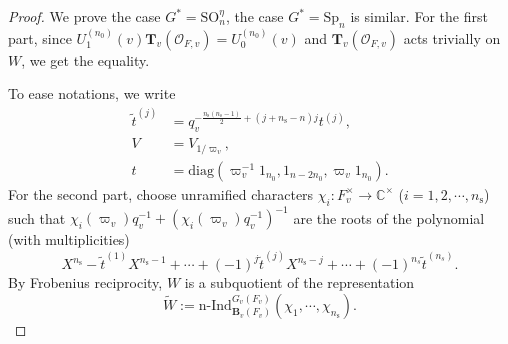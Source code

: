 \documentclass[12pt,oneside,reqno]{amsart}
\theoremstyle{plain}
\begin{document}
	\begin{proof}
		We prove the case $G^\ast=\mathrm{SO}_n^\eta$, the case $G^\ast=\mathrm{Sp}_n$ is similar.
		For the first part,
		since
		$U_1^{(n_0)}(v)
		\mathbf{T}_v(\mathcal{O}_{F,v})
		=
		U_0^{(n_0)}(v)$
		and
		$\mathbf{T}_v(\mathcal{O}_{F,v})$
		acts trivially on
		$W$,
		we get the equality.
		
		
		
		
		To ease notations,
		we write
		\begin{align*}
			\widetilde{t}^{(j)}
			&
			=
			q_v^{-\frac{n_\mathrm{s}(n_\mathrm{s}-1)}{2}+(j+n_\mathrm{s}-n)j}
			t^{(j)},
			\\
			V
			&
			=V_{1/\varpi_v},
			\\	  	
			t
			&
			=
			\mathrm{diag}
			(\varpi_v^{-1}1_{n_0},1_{n-2n_0},\varpi_v1_{n_0}).
		\end{align*}
		For the second part,
		choose unramified characters
		$\chi_i\colon
		F_v^\times
		\rightarrow
		\mathbb{C}^\times$
		($i=1,2,\cdots,n_\mathrm{s}$)
		such that
		$\chi_i(\varpi_v)
		q_v^{-1}
		+
		(\chi_i(\varpi_v)q_v^{-1})^{-1}$
		are the roots of the polynomial
		(with multiplicities)
		\[
		X^{n_\mathrm{s}}
		-
		\widetilde{t}^{(1)}
		X^{n_\mathrm{s}-1}
		+
		\cdots
		+
		(-1)^{j}
		\widetilde{t}^{(j)}
		X^{n_\mathrm{s}-j}
		+
		\cdots
		+
		(-1)^{n_s}
		\widetilde{t}^{(n_s)}.
		\]
		By Frobenius reciprocity,		
		$W$ is a subquotient of the representation
		\[
		\widetilde{W}
		:=
		\mathrm{n}\text{-}\mathrm{Ind}_{\mathbf{B}_v(F_v)}^{ G_v(F_v)}
		(\chi_1,\cdots,\chi_{n_\mathrm{s}}).
		\]
		
		
		
		
		

\end{proof}
\end{document}
